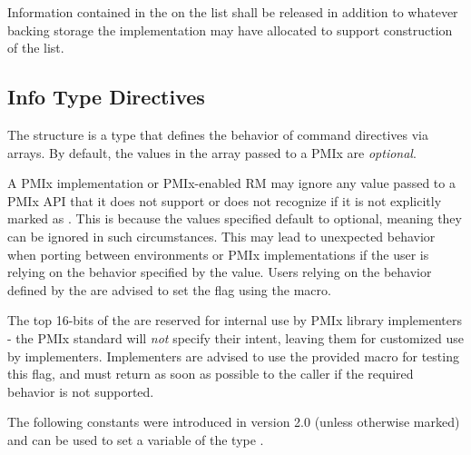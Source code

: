 \descr

Information contained in the  on the list shall be released in addition to whatever backing storage the implementation may have allocated to support construction of the list.


\subsection{Info Type Directives}
\label{api:struct:infodirs}

The  structure is a  type that defines the behavior of command directives via  arrays.
By default, the values in the  array passed to a PMIx are \emph{optional}.

\adviceuserstart
A PMIx implementation or PMIx-enabled \ac{RM} may ignore any  value passed to a \ac{PMIx} \ac{API} that it does not support or does not recognize if it is not explicitly marked as .
This is because the values specified default to optional, meaning they can be ignored in such circumstances.
This may lead to unexpected behavior when porting between environments or \ac{PMIx} implementations if the user is relying on the behavior specified by the  value.
Users relying on the behavior defined by the  are advised to set the  flag using the  macro.
\adviceuserend

\adviceimplstart
The top 16-bits of the  are reserved for internal use by \ac{PMIx} library implementers - the \ac{PMIx} standard will \textit{not} specify their intent, leaving them for customized use by implementers. Implementers are advised to use the provided  macro for testing this flag, and must return  as soon as possible to the caller if the required behavior is not supported.
\adviceimplend

The following constants were introduced in version 2.0 (unless otherwise marked) and can be used to set a variable of the type .

